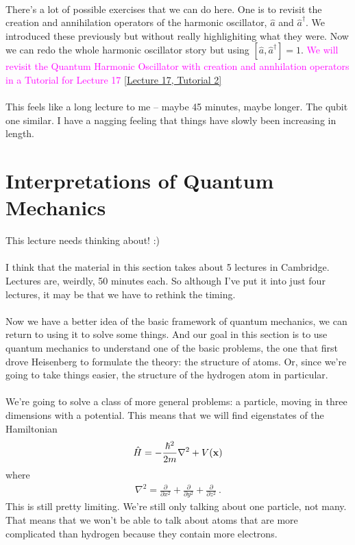 \documentclass[12pt]{article}
\def\be{\begin{eqnarray}}
\def\ee{\end{eqnarray}}
\newcommand\para{\paragraph{}}
\newcommand{\ppp}[2]{\frac{\partial {#1}}{\partial {#2}}}
\newcommand{\co}{\color{olive}}
\newcommand{\cblue}{\color{blue}}
\newcommand{\cred}{\color{red}}
\newcommand{\bx}{{\bf x}}
\newcommand{\alyssa}{\textcolor{magenta}}
\begin{document}
{\para
{\cblue There's a lot of possible exercises that we can do here. One is to revisit the creation and annihilation operators of the harmonic oscillator, $\hat{a}$ and $\hat{a}^\dagger$. We introduced these previously but without really highlighiting what they were. Now we can redo the whole harmonic oscillator story but using $[\hat{a},\hat{a}^\dagger]=1$. } \alyssa{We will revisit the Quantum Harmonic Oscillator with creation and annhilation operators in a Tutorial for Lecture 17} \href{https://drive.google.com/file/d/14k03OegKK7EO5YkkT6GodccZlMBsELQO/view?usp=drive_link}{[Lecture 17, Tutorial 2]}

\para
{\cred This feels like a long lecture to me -- maybe 45 minutes, maybe longer. The qubit one similar. I have a nagging feeling that things have slowly been increasing in length.}

\newpage
\section{Interpretations of Quantum Mechanics}

{\cblue This lecture needs thinking about! :)}


\newpage
{}

\para
{\cred I think that the material in this section takes about 5 lectures in Cambridge. Lectures are, weirdly, 50 minutes each. So although I've put it into just four lectures, it may be that we have to rethink the timing.} 


\para
Now we have a better idea of the basic framework of quantum mechanics, we can return to using it to solve some things. And our goal in this section is to use quantum mechanics to understand one of the basic problems, the one that first drove Heisenberg to formulate the theory: the structure of atoms. Or, since we're going to take things easier, the structure of the hydrogen atom in particular.

\para
{\co We're going to solve a class of more general problems: a particle, moving in three dimensions with a potential. This means that we will find eigenstates of the Hamiltonian
%
\be \hat{H} = -\frac{\hbar^2}{2m}\nabla^2 + V(\bx)\ee
%
where
%
\be \nabla^2 = \ppp{}{x^2} + \ppp{}{y^2} + \ppp{}{z^2}\ .\ee
%
} This is still pretty limiting. We're still only talking about one particle, not many. That means that we won't be able to talk about atoms that are more complicated than hydrogen because they contain more electrons. 

}
\end{document}
